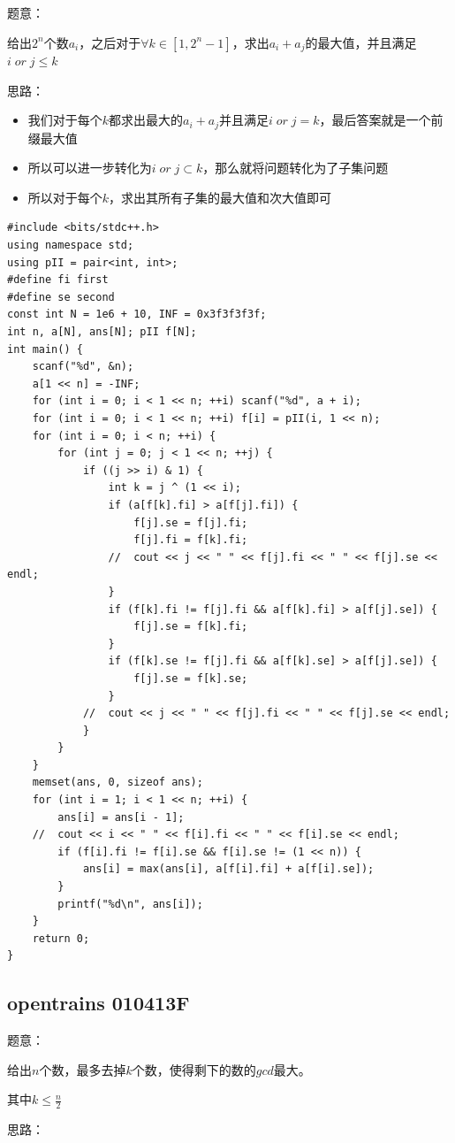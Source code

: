 题意：\par
给出$2^n$个数$a_i$，之后对于$\forall k \in [1, 2^n - 1]$，求出$a_i + a_j$的最大值，并且满足$i \; or \; j \leq k$\par
思路：\par
\begin{itemize}
\item 我们对于每个$k$都求出最大的$a_i + a_j$并且满足$i\; or \; j = k$，最后答案就是一个前缀最大值
\item 所以可以进一步转化为$i \; or \; j \subset k$，那么就将问题转化为了子集问题
\item 所以对于每个$k$，求出其所有子集的最大值和次大值即可
\end{itemize} \par
\begin{lstlisting}
#include <bits/stdc++.h>
using namespace std;
using pII = pair<int, int>;
#define fi first
#define se second
const int N = 1e6 + 10, INF = 0x3f3f3f3f;
int n, a[N], ans[N]; pII f[N];  
int main() {
	scanf("%d", &n);
	a[1 << n] = -INF;
	for (int i = 0; i < 1 << n; ++i) scanf("%d", a + i);
	for (int i = 0; i < 1 << n; ++i) f[i] = pII(i, 1 << n);
	for (int i = 0; i < n; ++i) {	
		for (int j = 0; j < 1 << n; ++j) {
			if ((j >> i) & 1) {
				int k = j ^ (1 << i);
				if (a[f[k].fi] > a[f[j].fi]) {
					f[j].se = f[j].fi;
					f[j].fi = f[k].fi;
				//	cout << j << " " << f[j].fi << " " << f[j].se << endl;
				} 
				if (f[k].fi != f[j].fi && a[f[k].fi] > a[f[j].se]) {
					f[j].se = f[k].fi;
				}
				if (f[k].se != f[j].fi && a[f[k].se] > a[f[j].se]) {
					f[j].se = f[k].se;
				} 
			//	cout << j << " " << f[j].fi << " " << f[j].se << endl;
			}
		}
	}
	memset(ans, 0, sizeof ans);
	for (int i = 1; i < 1 << n; ++i) {
		ans[i] = ans[i - 1];
	//	cout << i << " " << f[i].fi << " " << f[i].se << endl;
		if (f[i].fi != f[i].se && f[i].se != (1 << n)) {
			ans[i] = max(ans[i], a[f[i].fi] + a[f[i].se]);
		}
		printf("%d\n", ans[i]);
	}
	return 0;
}
\end{lstlisting}

\subsection{opentrains 010413F}


题意：\par
给出$n$个数，最多去掉$k$个数，使得剩下的数的$gcd$最大。\par
其中$k \leq \frac{n}{2}$\par

思路：\par

